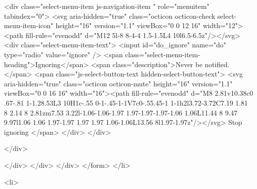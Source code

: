                 <div class="select-menu-item js-navigation-item " role="menuitem" tabindex="0">
                  <svg aria-hidden="true" class="octicon octicon-check select-menu-item-icon" height="16" version="1.1" viewBox="0 0 12 16" width="12"><path fill-rule="evenodd" d="M12 5l-8 8-4-4 1.5-1.5L4 10l6.5-6.5z"/></svg>
                  <div class="select-menu-item-text">
                    <input id="do_ignore" name="do" type="radio" value="ignore" />
                    <span class="select-menu-item-heading">Ignoring</span>
                    <span class="description">Never be notified.</span>
                    <span class="js-select-button-text hidden-select-button-text">
                      <svg aria-hidden="true" class="octicon octicon-mute" height="16" version="1.1" viewBox="0 0 16 16" width="16"><path fill-rule="evenodd" d="M8 2.81v10.38c0 .67-.81 1-1.28.53L3 10H1c-.55 0-1-.45-1-1V7c0-.55.45-1 1-1h2l3.72-3.72C7.19 1.81 8 2.14 8 2.81zm7.53 3.22l-1.06-1.06-1.97 1.97-1.97-1.97-1.06 1.06L11.44 8 9.47 9.97l1.06 1.06 1.97-1.97 1.97 1.97 1.06-1.06L13.56 8l1.97-1.97z"/></svg>
                        Stop ignoring
                    </span>
                  </div>
                </div>

              </div>

            </div>
          </div>
        </div>
</form>
  </li>

  <li>
    
